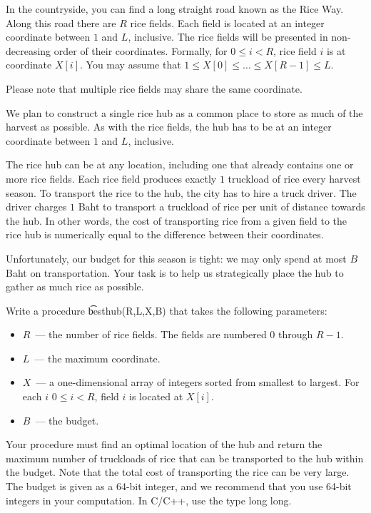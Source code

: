 In the countryside, you can find a long straight road known as the Rice Way. Along this road there are $R$ rice fields. Each field is located at an integer coordinate between $1$ and $L$, inclusive. The rice fields will be presented in non-decreasing order of their coordinates. Formally, for $0 \le i < R$, rice field $i$ is at coordinate $X[i]$. You may assume that $1 \le X[0] \le \ldots \le X[R-1] \le L$.

Please note that multiple rice fields may share the same coordinate.

We plan to construct a single rice hub as a common place to store as much of the harvest as possible. As with the rice fields, the hub has to be at an integer coordinate between $1$ and $L$, inclusive.

The rice hub can be at any location, including one that already contains one or more rice fields. Each rice field produces exactly $1$ truckload of rice every harvest season. To transport the rice to the hub, the city has to hire a truck driver. The driver charges $1$ Baht to transport a truckload of rice per unit of distance towards the hub. In other words, the cost of transporting rice from a given field to the rice hub is numerically equal to the difference between their coordinates.

Unfortunately, our budget for this season is tight: we may only spend at most $B$ Baht on transportation. Your task is to help us strategically place the hub to gather as much rice as possible.

Write a procedure \t{besthub(R,L,X,B)} that takes the following parameters:
\begin{itemize}
\item $R$~--- the number of rice fields. The fields are numbered $0$ through $R-1$.
\item $L$~--- the maximum coordinate.
\item $X$~--- a one-dimensional array of integers sorted from smallest to largest.
For each $i$ $0 \le i < R$, field $i$ is located at $X[i]$.
\item $B$~--- the budget.
\end{itemize}

Your procedure must find an optimal location of the hub and return the maximum number of truckloads of rice that can be transported to the hub within the budget.
Note that the total cost of transporting the rice can be very large. The budget is given as a 64-bit integer, and we recommend that you use 64-bit integers in your computation. In C/C++, use the type long long.